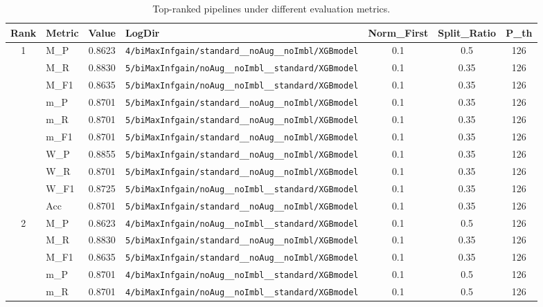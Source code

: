 \begin{table}[htbp]
\caption{Top-ranked pipelines under different evaluation metrics.}
\label{tab:rank_metric_vertical}
\centering
\small
\setlength{\tabcolsep}{4pt}
\begin{tabular}{|c|l|c|>{\ttfamily\footnotesize}p{7.2cm}|c|c|c|}
\hline
Rank & Metric & Value & LogDir & Norm\_First & Split\_Ratio & P\_th \\
\hline
\multirow{10}{*}{1} & M\_P & 0.8623 & \texttt{4/biMaxInfgain/standard\_\_noAug\_\_noImbl/XGBmodel} & 0.1 & 0.5  & 126 \\ 
 & M\_R & 0.8830 & \texttt{5/biMaxInfgain/noAug\_\_noImbl\_\_standard/XGBmodel} & 0.1 & 0.35  & 126 \\ 
 & M\_F1 & 0.8635 & \texttt{5/biMaxInfgain/noAug\_\_noImbl\_\_standard/XGBmodel} & 0.1 & 0.35  & 126 \\ 
 & m\_P & 0.8701 & \texttt{5/biMaxInfgain/standard\_\_noAug\_\_noImbl/XGBmodel} & 0.1 & 0.35  & 126 \\ 
 & m\_R & 0.8701 & \texttt{5/biMaxInfgain/standard\_\_noAug\_\_noImbl/XGBmodel} & 0.1 & 0.35  & 126 \\ 
 & m\_F1 & 0.8701 & \texttt{5/biMaxInfgain/standard\_\_noAug\_\_noImbl/XGBmodel} & 0.1 & 0.35  & 126 \\ 
 & W\_P & 0.8855 & \texttt{5/biMaxInfgain/standard\_\_noAug\_\_noImbl/XGBmodel} & 0.1 & 0.35  & 126 \\ 
 & W\_R & 0.8701 & \texttt{5/biMaxInfgain/standard\_\_noAug\_\_noImbl/XGBmodel} & 0.1 & 0.35  & 126 \\ 
 & W\_F1 & 0.8725 & \texttt{5/biMaxInfgain/noAug\_\_noImbl\_\_standard/XGBmodel} & 0.1 & 0.35  & 126 \\ 
 & Acc & 0.8701 & \texttt{5/biMaxInfgain/standard\_\_noAug\_\_noImbl/XGBmodel} & 0.1 & 0.35  & 126 \\ 
\hline
\multirow{10}{*}{2} & M\_P & 0.8623 & \texttt{4/biMaxInfgain/noAug\_\_noImbl\_\_standard/XGBmodel} & 0.1 & 0.5  & 126 \\ 
 & M\_R & 0.8830 & \texttt{5/biMaxInfgain/standard\_\_noAug\_\_noImbl/XGBmodel} & 0.1 & 0.35  & 126 \\ 
 & M\_F1 & 0.8635 & \texttt{5/biMaxInfgain/standard\_\_noAug\_\_noImbl/XGBmodel} & 0.1 & 0.35  & 126 \\ 
 & m\_P & 0.8701 & \texttt{4/biMaxInfgain/noAug\_\_noImbl\_\_standard/XGBmodel} & 0.1 & 0.5  & 126 \\ 
 & m\_R & 0.8701 & \texttt{4/biMaxInfgain/noAug\_\_noImbl\_\_standard/XGBmodel} & 0.1 & 0.5  & 126 \\ 

\end{tabular}
\end{table}
